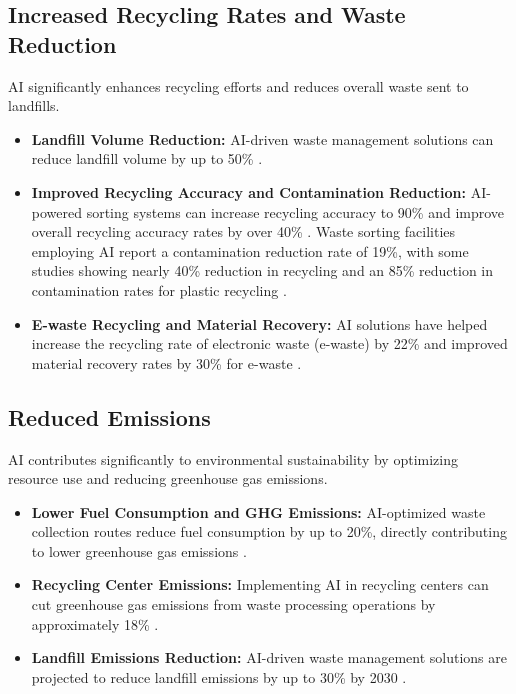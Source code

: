 \subsection{Increased Recycling Rates and Waste Reduction}
AI significantly enhances recycling efforts and reduces overall waste sent to landfills.
\begin{itemize}
    \item \textbf{Landfill Volume Reduction:} AI-driven waste management solutions can reduce landfill volume by up to 50\% \cite{Zipdo_Benefits_1, ITU_Benefits}.
    \item \textbf{Improved Recycling Accuracy and Contamination Reduction:} AI-powered sorting systems can increase recycling accuracy to 90\% and improve overall recycling accuracy rates by over 40\% \cite{Wifitalents_Benefits}. Waste sorting facilities employing AI report a contamination reduction rate of 19\%, with some studies showing nearly 40\% reduction in recycling and an 85\% reduction in contamination rates for plastic recycling \cite{Zipdo_Benefits_1, Zipdo_Benefits_2}.
    \item \textbf{E-waste Recycling and Material Recovery:} AI solutions have helped increase the recycling rate of electronic waste (e-waste) by 22\% and improved material recovery rates by 30\% for e-waste \cite{Zipdo_Benefits_2, SustainabilityDirectory_Benefits_1}.
\end{itemize}

\subsection{Reduced Emissions}
AI contributes significantly to environmental sustainability by optimizing resource use and reducing greenhouse gas emissions.
\begin{itemize}
    \item \textbf{Lower Fuel Consumption and GHG Emissions:} AI-optimized waste collection routes reduce fuel consumption by up to 20\%, directly contributing to lower greenhouse gas emissions \cite{Zipdo_Benefits_1, DVOTeam_Benefits}.
    \item \textbf{Recycling Center Emissions:} Implementing AI in recycling centers can cut greenhouse gas emissions from waste processing operations by approximately 18\% \cite{Zipdo_Benefits_2}.
    \item \textbf{Landfill Emissions Reduction:} AI-driven waste management solutions are projected to reduce landfill emissions by up to 30\% by 2030 \cite{Wifitalents_Benefits}.
\end{itemize}

